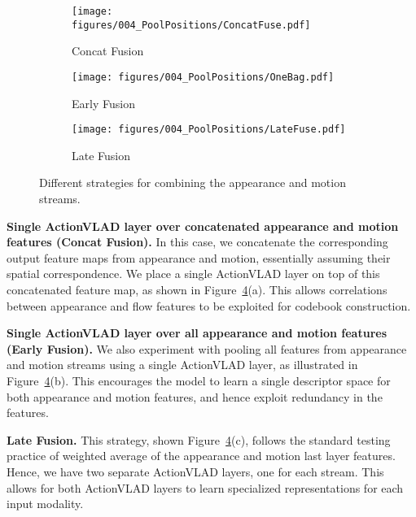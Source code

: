 \documentclass[10pt,twocolumn,letterpaper]{article}
\newcommand{\methodTag}[0]{ActionVLAD}
\begin{document}
\begin{figure}
    \centering
    \begin{subfigure}{0.32\linewidth} \centering
     \texttt{[image: figures/004\_PoolPositions/ConcatFuse.pdf]}
     \caption{Concat Fusion}\label{fig:rgbflow:concat}
   \end{subfigure}
   \begin{subfigure}{0.32\linewidth} \centering
     \texttt{[image: figures/004\_PoolPositions/OneBag.pdf]}
     \caption{Early Fusion}\label{fig:rgbflow:onebag}
   \end{subfigure}
   \begin{subfigure}{0.32\linewidth} \centering
     \texttt{[image: figures/004\_PoolPositions/LateFuse.pdf]}
     \caption{Late Fusion}\label{fig:rgbflow:late}
   \end{subfigure}
    \caption{Different strategies for combining the appearance and motion streams.
        }\label{fig:rgbflow-pooling}
\end{figure}



{\noindent \bf Single \methodTag{} layer over concatenated appearance and motion features (Concat Fusion).}
In this case, we concatenate the corresponding output feature maps from appearance and motion, essentially assuming their spatial correspondence. We place a single \methodTag{} layer on top of this concatenated feature map, as shown in Figure~\ref{fig:rgbflow-pooling}(a). This allows correlations between appearance and flow features to be exploited for codebook construction.

{\noindent \bf Single \methodTag{} layer over all appearance and motion features (Early Fusion).}
We also experiment with pooling all features from appearance and motion streams
using a single \methodTag{} layer, as illustrated in Figure~\ref{fig:rgbflow-pooling}(b). This encourages the model to learn a single descriptor space  for both appearance and motion features,
and hence exploit redundancy in the features.

{\noindent \bf Late Fusion.}
This strategy, shown Figure~\ref{fig:rgbflow-pooling}(c), follows the standard testing practice of weighted average of the appearance and motion
last layer features.
Hence, we have 
two separate \methodTag{} layers, one for each stream.
This allows for both \methodTag{} layers to learn specialized representations
for each input modality.
\end{document}
